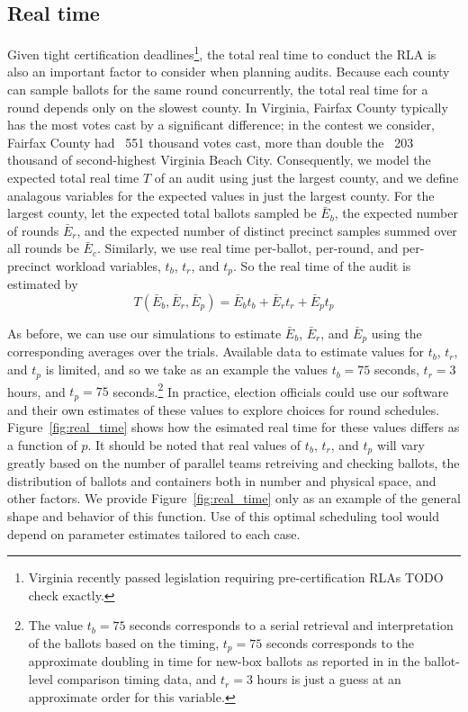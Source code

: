 \subsection{Real time}
Given tight certification deadlines\footnote{Virginia recently passed legislation requiring pre-certification RLAs TODO check exactly.}, the total real time to conduct the RLA is also an important factor to consider when planning audits.
Because each county can sample ballots for the same round concurrently, the total real time for a round depends only on the slowest county. 
In Virginia, Fairfax County typically has the most votes cast by a significant difference; in the contest we consider, Fairfax County had ~551 thousand votes cast, more than double the ~203 thousand of second-highest Virginia Beach City.
Consequently, we model the expected total real time $T$ of an audit using just the largest county, and we define analagous variables for the expected values in just the largest county.
For the largest county, let the expected total ballots sampled be $\bar E_b$, the expected number of rounds $\bar E_r$, and the expected number of distinct precinct samples summed over all rounds be $\bar E_c$.
Similarly, we use real time per-ballot, per-round, and per-precinct workload variables, $t_b$, $t_r$, and $t_p$. So the real time of the audit is estimated by
\begin{equation}
T(\bar E_b, \bar E_r, \bar E_p ) = \bar E_b t_b + \bar E_r t_r + \bar E_p t_p
\label{eq:real_time}
\end{equation}

As before, we can use our simulations to estimate $\bar E_b$, $\bar E_r$, and $\bar E_p$ using the corresponding averages over the trials. 
Available data to estimate values for $t_b$, $t_r$, and $t_p$ is limited, and so we take as an example the values $t_b=75$ seconds, $t_r=3$ hours, and $t_p=75$ seconds.\footnote{The value $t_b=75$ seconds corresponds to a serial retrieval and interpretation of the ballots based on the \cite{RI-report} timing, $t_p=75$ seconds corresponds to the approximate doubling in time for new-box ballots as reported in \cite{RI-report} in the ballot-level comparison timing data, and $t_r=3$ hours is just a guess at an approximate order for this variable.} In practice, election officials could use our software and their own estimates of these values to explore choices for round schedules. Figure~\ref{fig:real_time} shows how the esimated real time for these values differs as a function of $p$. It should be noted that real values of $t_b$, $t_r$, and $t_p$ will vary greatly based on the number of parallel teams retreiving and checking ballots, the distribution of ballots and containers both in number and physical space, and other factors. We provide Figure~\ref{fig:real_time} only as an example of the general shape and behavior of this function. Use of this optimal scheduling tool would depend on parameter estimates tailored to each case.

